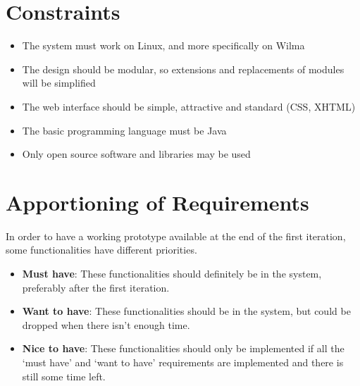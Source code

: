 \section{Constraints}

\begin{itemize}
	\item The system must work on Linux, and more specifically on Wilma
	\item The design should be modular, so extensions and replacements of 
	modules will be simplified
	\item The web interface should be simple, attractive and standard
	(CSS, XHTML)
	\item The basic programming language must be Java
	\item Only open source software and libraries may be used
\end{itemize}


\section{Apportioning of Requirements}

	In order to have a working prototype available at the end of the
	first iteration, some functionalities have different priorities.
	
	\begin{itemize}
		\item \textbf{Must have}: These functionalities should definitely 
		be in the system, preferably after the first iteration.
		\item \textbf{Want to have}: These functionalities should be in 
		the system, but could be dropped when there isn't enough time.
		\item \textbf{Nice to have}: These functionalities should only be 
		implemented if all the `must have' and `want to have' 
		requirements are implemented and there is still some time left.
	\end{itemize}